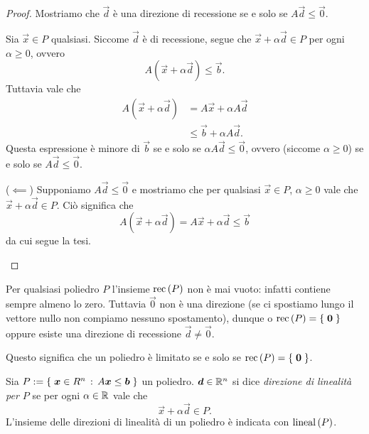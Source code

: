 \begin{proof}
    Mostriamo che $\vec d$ è una direzione di recessione se e solo se $A\vec d \leq \vec 0$.
    \begin{description}
        \item[($\implies$)] Sia $\vec x \in P$ qualsiasi. Siccome $\vec d$ è di recessione, segue che $\vec x + \alpha\vec d \in P$ per ogni $\alpha \geq 0$, ovvero \[
            A(\vec x + \alpha\vec d) \leq \vec b.
        \]
        Tuttavia vale che \begin{align*}
            A(\vec x + \alpha\vec d) &= A\vec x + \alpha A\vec d \tag{$A\vec x \leq \vec b$}\\
            &\leq \vec b + \alpha A\vec d.
        \end{align*} 
        Questa espressione è minore di $\vec b$ se e solo se $\alpha A\vec d \leq \vec 0$, ovvero (siccome $\alpha \geq 0$) se e solo se $A\vec d \leq \vec 0$.
        \item{($\impliedby$)} Supponiamo $A\vec d \leq \vec 0$ e mostriamo che per qualsiasi $\vec x \in P$, $\alpha \geq 0$ vale che $\vec x + \alpha\vec d \in P$. Ciò significa che \[
            A(\vec x + \alpha\vec d) = A\vec x + \alpha\vec d \leq \vec b  
        \] da cui segue la tesi. \qedhere
    \end{description}
\end{proof}

\begin{remark}
    Per qualsiasi poliedro $P$ l'insieme $\rec P$ non è mai vuoto: infatti contiene sempre almeno lo zero. Tuttavia $\vec 0$ non è una direzione (se ci spostiamo lungo il vettore nullo non compiamo nessuno spostamento), dunque o $\rec P = \set{\vec 0}$ oppure esiste una direzione di recessione $\vec d \neq \vec 0$.

    Questo significa che un poliedro è limitato se e solo se $\rec P = \set{\vec 0}$.
\end{remark}

\begin{definition}
    Sia $P := \left\{\;\bm{x} \in R^n \,:\, A\bm{x} \leq \bm{b}\;\right\}$ un poliedro. $\bm{d} \in \mathbb{R}^n$ si dice \emph{direzione di linealità per $P$} se per ogni $\alpha \in \mathbb{R}$ vale che \[
        \vec x + \alpha\vec d \in P.    
    \] L'insieme delle direzioni di linealità di un poliedro è indicata con $\lineal P$.
\end{definition}


